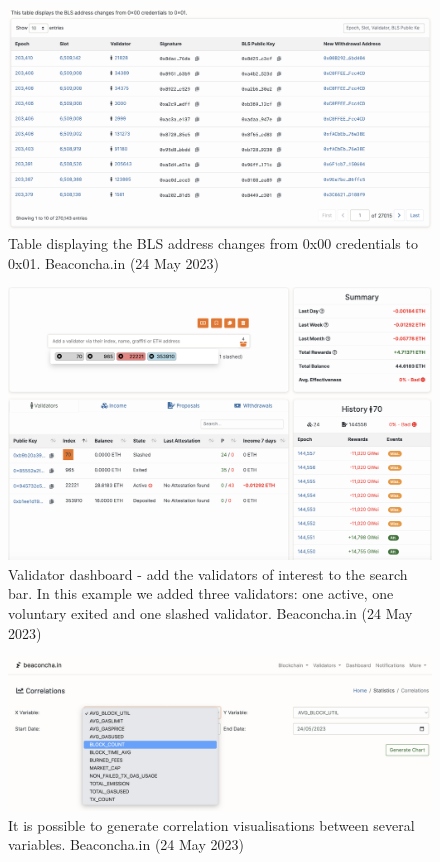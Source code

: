 \documentclass[UTF8]{article}
\begin{document}
{\begin{figure}[htbp]
\begin{center}
\includegraphics[width=0.9\linewidth]{images/bblschgs}
\caption{Table displaying the BLS address changes from 0x00 credentials to 0x01. Beaconcha.in (24 May 2023)}
\label{fig:bblschgs}
\end{center}
\end{figure}

\begin{figure}[htbp]
\begin{center}
\includegraphics[width=0.9\linewidth]{images/bvaldashboard}
\caption{Validator dashboard - add the validators of interest to the search bar. In this example we added three validators: one active, one voluntary exited and one slashed validator. Beaconcha.in (24 May 2023)}
\label{fig:bvaldashboard}
\end{center}
\end{figure}

\begin{figure}[htbp]
\begin{center}
\includegraphics[width=0.9\linewidth]{images/bcorrelations}
\caption{It is possible to generate correlation visualisations between several variables. Beaconcha.in (24 May 2023)}
\label{fig:bcorrelations}
\end{center}
\end{figure}

}
\end{document}
